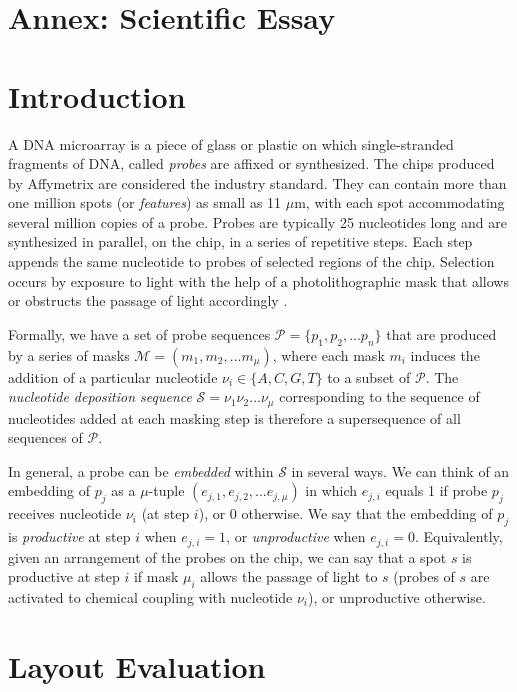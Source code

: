 \documentclass{article}
\begin{document}
\pagebreak

\section*{\centering Annex: Scientific Essay}

\section{Introduction}

A DNA microarray is a piece of glass or plastic on which single-stranded fragments of DNA, called \emph{probes} are affixed or synthesized. The chips produced by Affymetrix are considered the industry standard. They can contain more than one million spots (or \emph{features}) as small as 11 $\mu$m, with each spot accommodating several million copies of a probe. Probes are typically 25 nucleotides long and are synthesized in parallel, on the chip, in a series of repetitive steps. Each step appends the same nucleotide to probes of selected regions of the chip. Selection occurs by exposure to light with the help of a photolithographic mask that allows or obstructs the passage of light accordingly \cite{FODOR91}.

Formally, we have a set of probe sequences $\mathcal{P} = \{p_{1}, p_{2}, ... p_{n}\}$ that are produced by a series of masks $\mathcal{M} = (m_{1}, m_{2}, ... m_{\mu})$, where each mask $m_{i}$ induces the addition of a particular nucleotide $\nu_{i} \in \{A, C, G, T\}$ to a subset of $\mathcal{P}$. The \emph{nucleotide deposition sequence} $\mathcal{S} = \nu_{1} \nu_{2} \ldots \nu_{\mu}$ corresponding to the sequence of nucleotides added at each masking step is therefore a supersequence of all sequences of $\mathcal{P}$.

In general, a probe can be \emph{embedded} within $\mathcal{S}$ in several ways. We can think of an embedding of $p_{j}$ as a $\mu$-tuple $(e_{j,1}, e_{j,2}, ... e_{j,\mu})$ in which $e_{j,i}$ equals 1 if probe $p_{j}$ receives nucleotide $\nu_{i}$ (at step $i$), or 0 otherwise. We say that the embedding of $p_{j}$ is \emph{productive} at step $i$ when $e_{j,i} = 1$, or \emph{unproductive} when $e_{j,i} = 0$. Equivalently, given an arrangement of the probes on the chip, we can say that a spot $s$ is productive at step $i$ if mask $\mu_{i}$ allows the passage of light to $s$ (probes of $s$ are activated to chemical coupling with nucleotide $\nu_{i}$), or unproductive otherwise.

\section{Layout Evaluation}
\end{document}
